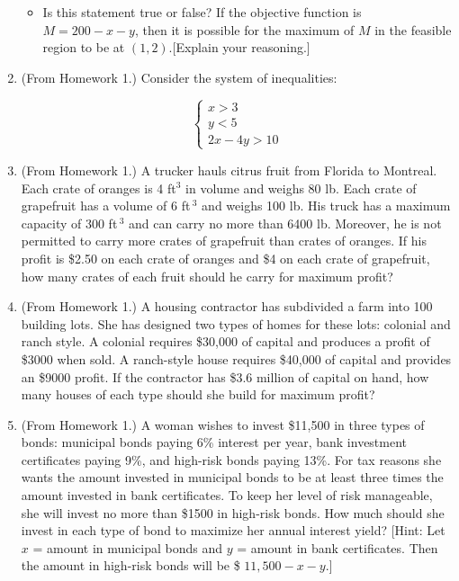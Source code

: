 \documentclass[11pt]{article}
\begin{document}
\begin{enumerate}
\begin{itemize}
\item Is this statement true or false? If the objective function is $\displaystyle M=200-x-y$, then it is possible for the maximum of $M$ in the feasible region to be at $(1,2)$.[Explain your reasoning.] 

\end{itemize}
\item (From Homework 1.) Consider the system of inequalities:

\[
\begin{cases}
    x>3\\
    y<5\\
    2x-4y>10 
\end{cases}
\]


\item (From Homework 1.) A trucker hauls citrus fruit from Florida to Montreal. Each crate of oranges is 4 ft${}^3$ in volume and weighs 80 lb. Each crate of grapefruit has a volume of 6 ft$\,^3$ and weighs 100 lb. His truck has a maximum capacity of 300 ft$\,^3$ and can carry no more than 6400 lb. Moreover, he is not permitted to carry more crates of grapefruit than crates of oranges. If his profit is \$2.50 on each crate of oranges and \$4 on each crate of grapefruit, how many crates of each fruit should he carry for maximum profit?

\item (From Homework 1.) A housing contractor has subdivided a farm into 100 building lots. She has designed two types of homes for these lots: colonial and ranch style. A colonial requires \$30,000 of capital and produces a profit of \$3000 when sold. A ranch-style house requires \$40,000 of capital and provides an \$9000 profit. If the contractor has \$3.6 million of capital on hand, how many houses of each type should she build for maximum profit?

\item (From Homework 1.) A woman wishes to invest \$11,500 in three types of bonds: municipal bonds paying 6\% interest per year, bank investment certificates paying 9\%, and high-risk bonds paying 13\%. For tax reasons she wants the amount invested in municipal bonds to be at least three times the amount invested in bank certificates. To keep her level of risk manageable, she will invest no more than \$1500 in high-risk bonds. How much should she invest in each type of bond to maximize her annual interest yield? [Hint: Let 
$x$ = amount in municipal bonds
 and 
$y$ = amount in bank certificates.
 Then the amount in high-risk bonds will be 
\$ $11,500 - x - y$.]


\end{enumerate}
\end{document}
